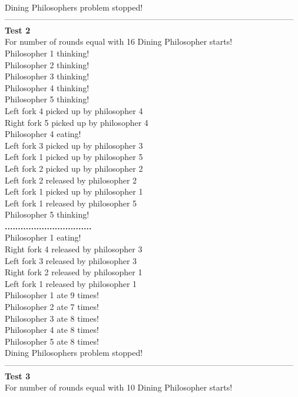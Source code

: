 \documentclass[14pt]{article}
\begin{document}
\\Dining Philosophers problem stopped!
\\---------------------------------------------------------------------------------------------------------
\\\textbf{Test 2}
\\For number of rounds equal with 16 Dining Philosopher starts!
\\Philosopher 1 thinking!
\\Philosopher 2 thinking!
\\Philosopher 3 thinking!
\\Philosopher 4 thinking!
\\Philosopher 5 thinking!
\\Left fork 4 picked up by philosopher 4
\\Right fork 5 picked up by philosopher 4
\\Philosopher 4 eating!
\\Left fork 3 picked up by philosopher 3
\\Left fork 1 picked up by philosopher 5
\\Left fork 2 picked up by philosopher 2
\\Left fork 2 released by philosopher 2
\\Left fork 1 picked up by philosopher 1
\\Left fork 1 released by philosopher 5
\\Philosopher 5 thinking!
\\\textbf{.................................}
\\Philosopher 1 eating!
\\Right fork 4 released by philosopher 3
\\Left fork 3 released by philosopher 3
\\Right fork 2 released by philosopher 1
\\Left fork 1 released by philosopher 1
\\Philosopher 1 ate 9 times!
\\Philosopher 2 ate 7 times!
\\Philosopher 3 ate 8 times!
\\Philosopher 4 ate 8 times!
\\Philosopher 5 ate 8 times!
\\Dining Philosophers problem stopped!
\\---------------------------------------------------------------------------------------------------------
\\\textbf{Test 3}
\\For number of rounds equal with 10 Dining Philosopher starts!
\end{document}
